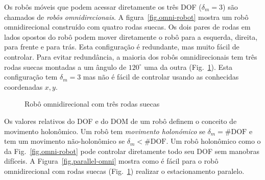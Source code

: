Os robôs móveis que podem acessar diretamente os três DOF ($\delta_m=3$) são chamados de \emph{robôs omnidirecionais}. A figura~\ref{fig.omni-robot} mostra um robô omnidirecional construído com quatro rodas suecas. Os dois pares de rodas em lados opostos do robô podem mover diretamente o robô para a esquerda, direita, para frente e para trás. Esta configuração é redundante, mas muito fácil de controlar. Para evitar redundância, a maioria dos robôs omnidirecionais tem três rodas suecas montadas a um ângulo de $120^\circ$ uma da outra (Fig.~\ref{fig.omni3}). Esta configuração tem $\delta_m=3$ mas não é fácil de controlar usando as conhecidas coordenadas $x,y$.

\begin{figure}
\begin{center}
\end{center}
\caption{Robô omnidirecional com três rodas suecas}\label{fig.omni3}
\end{figure}

Os valores relativos do DOF e do DOM de um robô definem o conceito de movimento holonômico. Um robô tem \emph{movimento holonómico} se $\delta_m = \#\textrm{DOF}$ e tem um movimento {não-holonômico} se $\delta_m < \#\textrm{DOF}$. Um robô holonômico como o da Fig.~\ref{fig.omni-robot} pode controlar diretamente todo seu DOF sem manobras difíceis. A Figura~\ref{fig.parallel-omni} mostra como é fácil para o robô omnidirecional com rodas suecas (Fig.~\ref{fig.omni3}) realizar o estacionamento paralelo.

